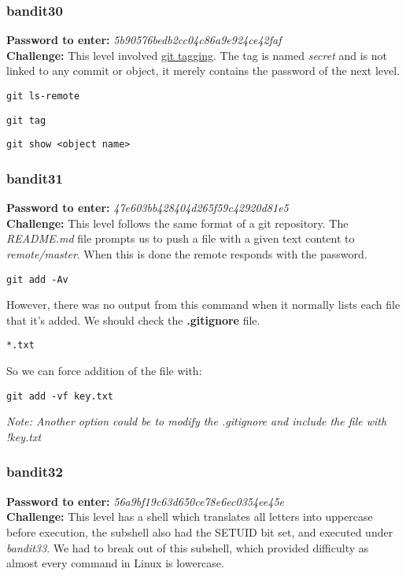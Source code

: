 \documentclass[a4paper]{article}
\newcommand{\pass}[1]{\textbf{Password to enter:} \textit{#1}\\}
\newcommand{\chall}{\textbf{Challenge:} }
\begin{document}
\subsubsection{bandit30}
\pass{5b90576bedb2cc04c86a9e924ce42faf}
\chall This level involved \href{https://git-scm.com/book/en/v2/Git-Basics-Tagging}{git tagging}. The tag is named \textit{secret} and is not linked to any commit or object, it merely contains the password of the next level.
\begin{lstlisting}[title=show all objects on the remote,deletekeywords={ls}]
git ls-remote
\end{lstlisting}
\begin{lstlisting}[title=show all local tags]
git tag
\end{lstlisting}
\begin{lstlisting}[title=show more information about a given object]
git show <object name>
\end{lstlisting}

\subsubsection{bandit31}
\pass{47e603bb428404d265f59c42920d81e5}
\chall This level follows the same format of a git repository. The \textit{README.md} file prompts us to push a file with a given text content to \textit{remote/master}. When this is done the remote responds with the password.
\begin{lstlisting}[title=my default way to add files to the index]
git add -Av
\end{lstlisting}
However, there was no output from this command when it normally lists each file that it's added. We should check the \textbf{.gitignore} file.
\begin{lstlisting}[title=contents of this specific .gitignore]
*.txt
\end{lstlisting}
So we can force addition of the file with:
\begin{lstlisting}
git add -vf key.txt
\end{lstlisting}
\textit{Note: Another option could be to modify the \textit{.gitignore} and include the file with \textit{!key.txt}}


\subsubsection{bandit32}
\pass{56a9bf19c63d650ce78e6ec0354ee45e}
\chall This level has a shell which translates all letters into uppercase before execution, the subshell also had the SETUID bit set, and executed under \textit{bandit33}. We had to break out of this subshell, which provided difficulty as almost every command in Linux is lowercase.
\end{document}
